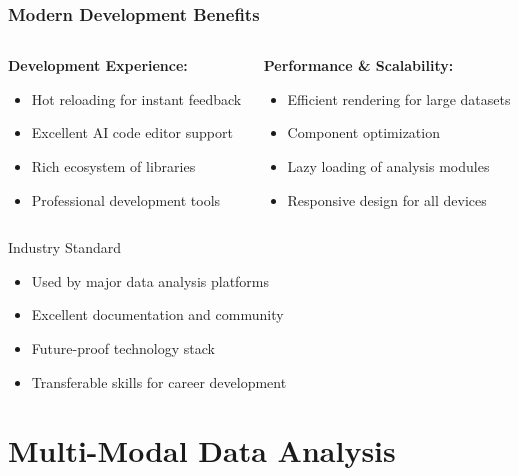 \documentclass[aspectratio=169]{beamer}
\begin{document}
\begin{frame}
\frametitle{Modern Development Benefits}
\begin{columns}
\begin{column}{0.5\textwidth}
\textbf{Development Experience:}
\begin{itemize}
\item Hot reloading for instant feedback
\item Excellent AI code editor support
\item Rich ecosystem of libraries
\item Professional development tools
\end{itemize}
\end{column}
\begin{column}{0.5\textwidth}
\textbf{Performance \& Scalability:}
\begin{itemize}
\item Efficient rendering for large datasets
\item Component optimization
\item Lazy loading of analysis modules
\item Responsive design for all devices
\end{itemize}
\end{column}
\end{columns}

\begin{alertblock}{Industry Standard}
\begin{itemize}
\item Used by major data analysis platforms
\item Excellent documentation and community
\item Future-proof technology stack
\item Transferable skills for career development
\end{itemize}
\end{alertblock}
\end{frame}

\section{Multi-Modal Data Analysis}
\end{document}
